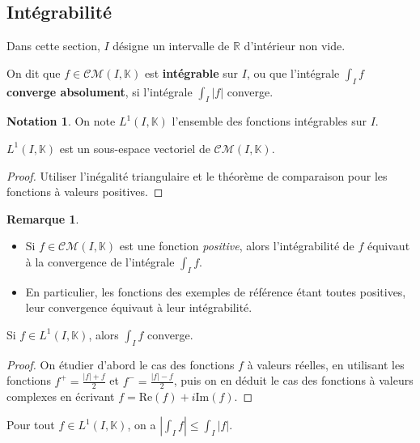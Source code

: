 \documentclass[french]{article}
\newcommand{\R}{\mathbb{R}}
\newcommand{\K}{\mathbb{K}}
\theoremstyle{plain}
\theoremstyle{definition}
\newtheorem*{rmq}{Remarque}
\newtheorem*{notation}{Notation}
\theoremstyle{remark}
\begin{document}
\subsection{Intégrabilité}

Dans cette section, $I$ désigne un intervalle de $\R$ d'intérieur non vide.

\begin{dfn}
	On dit que $f\in\mathcal{CM}(I,\K)$ est \textbf{intégrable} sur $I$, ou que l'intégrale $\displaystyle\int_I f$ \textbf{converge absolument}, si l'intégrale $\displaystyle\int_I \lvert f\rvert$ converge.
\end{dfn}

\begin{notation}
	On note $L^1(I,\K)$ l'ensemble des fonctions intégrables sur $I$.
\end{notation}

\begin{prop}%
	$L^1(I,\K)$ est un sous-espace vectoriel de $\mathcal{CM}(I,\K)$.
\end{prop}
\begin{proof}
	Utiliser l'inégalité triangulaire et le théorème de comparaison pour les fonctions à valeurs positives.
\end{proof}

\begin{rmq}
	\begin{itemize}
		\item Si $f\in\mathcal{CM}(I,\K)$ est une fonction \textit{positive}, alors l'intégrabilité de $f$ équivaut à la convergence de l'intégrale $\displaystyle\int_I f$.
		\item En particulier, les fonctions des exemples de référence étant toutes positives, leur convergence équivaut à leur intégrabilité.
	\end{itemize}
\end{rmq}

\begin{thm}%
	Si $f\in L^1(I,\K)$, alors $\displaystyle\int_If$ converge.
\end{thm}
\begin{proof}
	On étudier d'abord le cas des fonctions $f$ à valeurs réelles, en utilisant les fonctions $f^+=\displaystyle\frac{\lvert f\rvert+f}{2}$ et $f^-=\displaystyle\frac{\lvert f\rvert-f}{2}$, puis on en déduit le cas des fonctions à valeurs complexes en écrivant $f=\text{Re}(f)+i\text{Im}(f)$.
\end{proof}

\begin{thm}%
	Pour tout $f\in L^1(I,\K)$, on a $\displaystyle\left\lvert\int_If\right\rvert\leqslant\int_I \lvert f\rvert$.
\end{thm}
\end{document}
